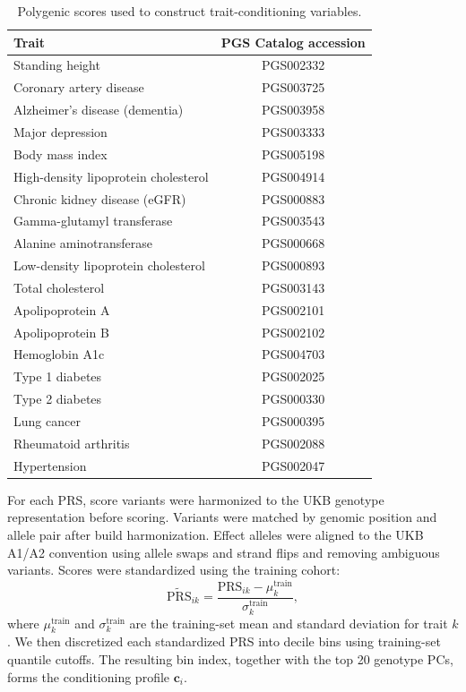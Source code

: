 \documentclass{article}
\begin{document}
\begin{table}[t]
\centering
\caption{Polygenic scores used to construct trait-conditioning variables.}
\label{tab:prs_sources}

\setlength{\tabcolsep}{5pt}
\renewcommand{\arraystretch}{0.95}
\begin{tabular}{lc}
\toprule
Trait & PGS Catalog accession \\
\midrule
Standing height & PGS002332 \\
Coronary artery disease & PGS003725 \\
Alzheimer's disease (dementia) & PGS003958 \\
Major depression &  PGS003333 \\
Body mass index &  PGS005198 \\
High-density lipoprotein cholesterol & PGS004914 \\
Chronic kidney disease (eGFR) & PGS000883 \\
Gamma-glutamyl transferase & PGS003543 \\
Alanine aminotransferase  & PGS000668 \\
Low-density lipoprotein cholesterol  & PGS000893 \\
Total cholesterol & PGS003143 \\
Apolipoprotein A  & PGS002101 \\
Apolipoprotein B  & PGS002102 \\
Hemoglobin A1c &  PGS004703 \\
Type 1 diabetes  & PGS002025 \\
Type 2 diabetes & PGS000330 \\
Lung cancer & PGS000395 \\
Rheumatoid arthritis & PGS002088 \\
Hypertension & PGS002047 \\
\bottomrule
\end{tabular}
\end{table}

For each PRS, score variants were harmonized to the UKB genotype representation before scoring. Variants were matched by genomic position and allele pair after build harmonization. Effect alleles were aligned to the UKB A1/A2 convention using allele swaps and strand flips and removing ambiguous variants. Scores were standardized using the training cohort:
\[
\widetilde{\mathrm{PRS}}_{ik}
=
\frac{\mathrm{PRS}_{ik}-\mu_k^{\mathrm{train}}}
{\sigma_k^{\mathrm{train}}},
\]
where \(\mu_k^{\mathrm{train}}\) and \(\sigma_k^{\mathrm{train}}\) are the training-set mean and standard deviation for trait \(k\). We then discretized each standardized PRS into decile bins using training-set quantile cutoffs. The resulting bin index, together with the top 20 genotype PCs, forms the conditioning profile \(\boldsymbol c_i\). 
\end{document}
